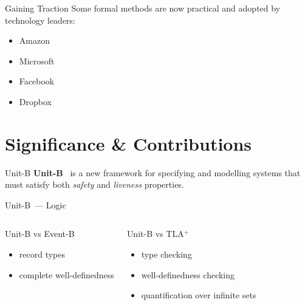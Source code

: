 \documentclass[10pt]{beamer}
\newcommand{\unitb}{Unit-B\xspace}
\newcommand{\eventb}{Event-B\xspace}
\newcommand{\tla}{TLA${}^+$\xspace}
\begin{document}
\begin{frame}[fragile]{Gaining Traction}
  Some formal methods are now practical and adopted by technology leaders:
  \begin{itemize}
  \item Amazon
  \item Microsoft
  \item Facebook
  \item Dropbox
  \end{itemize}
\end{frame}


\section{Significance \& Contributions}

\begin{frame}[fragile]{\unitb}
  \textbf{\unitb}~\cite{SoSyM/Hudon/Hoang/Ostroff15} is a new
  framework for specifying and modelling systems that must satisfy
  both \emph{safety} and \emph{liveness} properties.
\end{frame}

\begin{frame}[fragile]{\unitb\ --- Logic}
  \begin{columns}[T,onlytextwidth]
      \begin{block}{\unitb vs \eventb~\cite{DBLP:books/daglib/0024570}}
        \begin{itemize}
          \item record types
          \item complete well-definedness
      \end{itemize}
      \end{block}
      \pause


      \begin{block}{\unitb vs \tla~\cite{DBLP:books/aw/Lamport2002}}
        \begin{itemize}
          \item type checking
          \item well-definedness checking
          \item quantification over infinite sets\footnotemark
        \end{itemize}
      \end{block}
  \end{columns}
\end{frame}
\end{document}
